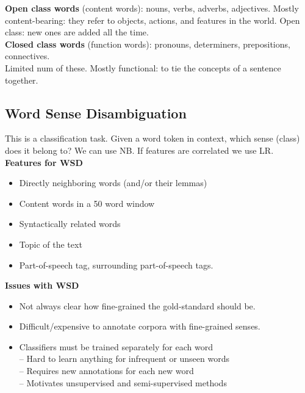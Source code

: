 \documentclass[8pt]{extarticle} %
\begin{document}
\begin{multicols*}{3}
\begin{itemize}[label=-, labelsep=0.3em, leftmargin=0.5em, itemsep=0em]
\end{itemize}
\textbf{Open class words} (content words): nouns, verbs, adverbs, adjectives. Mostly content-bearing: they refer to objects, actions, and features in the world. Open class: new ones are added all the time. \\
\textbf{Closed class words} (function words): pronouns, determiners, prepositions, connectives.\\
Limited num of these. Mostly functional: to tie the concepts of a sentence together.

\subsection*{Word Sense Disambiguation}
This is a classification task. Given a word token in context, which sense (class) does it belong to? 
We can use NB. If features are correlated we use LR. \\

\textbf{Features for WSD}
\begin{itemize}[label=\textbullet, labelsep=0.3em, leftmargin=0.5em, itemsep=0em]
    \item Directly neighboring words (and/or their lemmas)
    \item Content words in a 50 word window
    \item Syntactically related words
    \item Topic of the text
    \item Part-of-speech tag, surrounding part-of-speech tags. 
\end{itemize}

\textbf{Issues with WSD}
\begin{itemize}[label=\textbullet, labelsep=0.3em, leftmargin=0.5em, itemsep=0em]
\item Not always clear how fine-grained the gold-standard should be.
\item Difficult/expensive to annotate corpora with fine-grained senses.
\item Classifiers must be trained separately for each word\\
– Hard to learn anything for infrequent or unseen words\\
– Requires new annotations for each new word\\
– Motivates unsupervised and semi-supervised methods
\end{itemize}


\end{multicols*}
\end{document}
